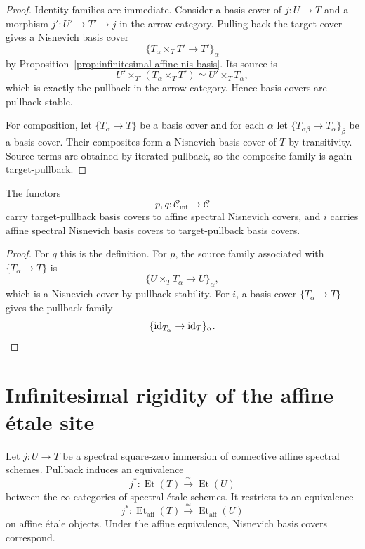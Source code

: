 \begin{proof}
Identity families are immediate.  Consider a basis cover of $j:U\to T$ and a
morphism $j':U'\to T'\to j$ in the arrow category.  Pulling back the target
cover gives a Nisnevich basis cover
\[
    \{T_\alpha\times_TT'\to T'\}_\alpha
\]
by Proposition~\ref{prop:infinitesimal-affine-nis-basis}.  Its source is
\[
    U'\times_{T'}(T_\alpha\times_TT')
    \simeq U'\times_TT_\alpha,
\]
which is exactly the pullback in the arrow category.  Hence basis covers are
pullback-stable.

For composition, let $\{T_\alpha\to T\}$ be a basis cover and for each
$\alpha$ let $\{T_{\alpha\beta}\to T_\alpha\}_\beta$ be a basis cover.
Their composites form a Nisnevich basis cover of $T$ by transitivity.  Source
terms are obtained by iterated pullback, so the composite family is again
target-pullback.
\end{proof}

\begin{proposition}
\label{prop:infinitesimal-endpoint-continuity}
The functors
\[
    p,q:\mathcal C_{\mathrm{inf}}\longrightarrow\mathcal C
\]
carry target-pullback basis covers to affine spectral Nisnevich covers, and
$i$ carries affine spectral Nisnevich basis covers to target-pullback basis
covers.
\end{proposition}

\begin{proof}
For $q$ this is the definition.  For $p$, the source family associated with
$\{T_\alpha\to T\}$ is
\[
    \{U\times_TT_\alpha\to U\}_\alpha,
\]
which is a Nisnevich cover by pullback stability.  For $i$, a basis cover
$\{T_\alpha\to T\}$ gives the pullback family
\[
    \{\operatorname{id}_{T_\alpha}\to\operatorname{id}_T\}_\alpha.
\]
\end{proof}

\section{Infinitesimal rigidity of the affine \texorpdfstring{\'etale}{etale} site}
\label{sec:infinitesimal-etale-rigidity}

\begin{lemma}
\label{lem:infinitesimal-one-stage-etale-rigidity}
Let $j:U\to T$ be a spectral square-zero immersion of connective affine
spectral schemes.  Pullback induces an equivalence
\[
    j^*:\operatorname{Et}(T)
    \xrightarrow{\simeq}
    \operatorname{Et}(U)
\]
between the $\infty$-categories of spectral \'etale schemes.  It restricts to
an equivalence
\[
    j^*:\operatorname{Et}_{\mathrm{aff}}(T)
    \xrightarrow{\simeq}
    \operatorname{Et}_{\mathrm{aff}}(U)
\]
on affine \'etale objects.  Under the affine equivalence, Nisnevich basis
covers correspond.
\end{lemma}

